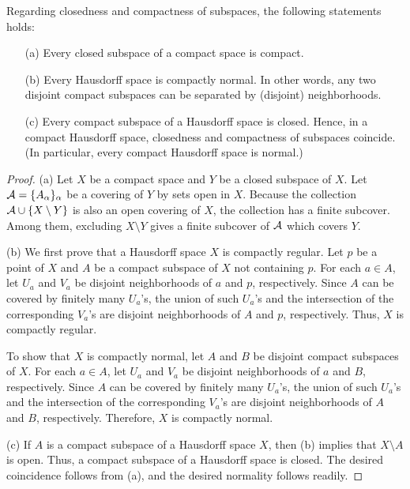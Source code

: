 \begin{thm}
    Regarding closedness and compactness of subspaces, the following statements holds:
    \begin{enumerate}
        \item[(a)]
        {
            Every closed subspace of a compact space is compact.
        }
        \item[(b)]
        {
            Every Hausdorff space is compactly normal.
            In other words, any two disjoint compact subspaces can be separated by (disjoint) neighborhoods.
        }
        \item[(c)]
        {
            Every compact subspace of a Hausdorff space is closed.
            Hence, in a compact Hausdorff space, closedness and compactness of subspaces coincide.
            (In particular, every compact Hausdorff space is normal.)
        }
    \end{enumerate}
\end{thm}
\begin{proof}
    \hangindent=0.65cm
    \noindent(a)
    Let $X$ be a compact space and $Y$ be a closed subspace of $X$.
    Let ${\mathcal{A}}=\{A_\alpha\}_\alpha$ be a covering of $Y$ by sets open in $X$.
    Because the collection ${\mathcal{A}}\cup\{X\setminus Y\}$ is also an open covering of $X$, the collection has a finite subcover.
    Among them, excluding $X\setminus Y$ gives a finite subcover of ${\mathcal{A}}$ which covers $Y$.

    \noindent(b)
    We first prove that a Hausdorff space $X$ is compactly regular.
    Let $p$ be a point of $X$ and $A$ be a compact subspace of $X$ not containing $p$.
    For each $a\in A$, let $U_a$ and $V_a$ be disjoint neighborhoods of $a$ and $p$, respectively.
    Since $A$ can be covered by finitely many $U_a$'s, the union of such $U_a$'s and the intersection of the corresponding $V_a$'s are disjoint neighborhoods of $A$ and $p$, respectively.
    Thus, $X$ is compactly regular.

    To show that $X$ is compactly normal, let $A$ and $B$ be disjoint compact subspaces of $X$.
    For each $a\in A$, let $U_a$ and $V_a$ be disjoint neighborhoods of $a$ and $B$, respectively.
    Since $A$ can be covered by finitely many $U_a$'s, the union of such $U_a$'s and the intersection of the corresponding $V_a$'s are disjoint neighborhoods of $A$ and $B$, respectively.
    Therefore, $X$ is compactly normal.
    
    \noindent(c)
    If $A$ is a compact subspace of a Hausdorff space $X$, then (b) implies that $X\setminus A$ is open.
    Thus, a compact subspace of a Hausdorff space is closed.
    The desired coincidence follows from (a), and the desired normality follows readily.
\end{proof}

